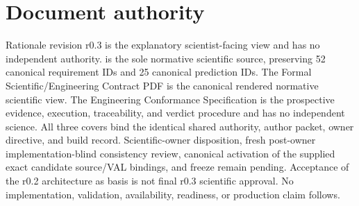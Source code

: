 \documentclass[10pt]{article}
\begin{document}
\section{Document authority}
Rationale revision r0.3 is the explanatory scientist-facing view and has no
independent authority. \SCIMapSharedAuthorityId{} is the sole
normative scientific source, preserving 52 canonical requirement IDs and 25
canonical prediction IDs. The Formal Scientific/Engineering Contract PDF is
the canonical rendered normative scientific view. The Engineering Conformance
Specification is the prospective evidence, execution, traceability, and
verdict procedure and has no independent science. All three covers bind the
identical shared authority, author packet, owner directive, and build record.
Scientific-owner disposition, fresh post-owner implementation-blind
consistency review, canonical activation of the supplied exact candidate
source/VAL bindings, and freeze remain pending. Acceptance of the r0.2
architecture as basis is not final r0.3 scientific approval.
No implementation, validation, availability,
readiness, or production claim follows.
\end{document}
